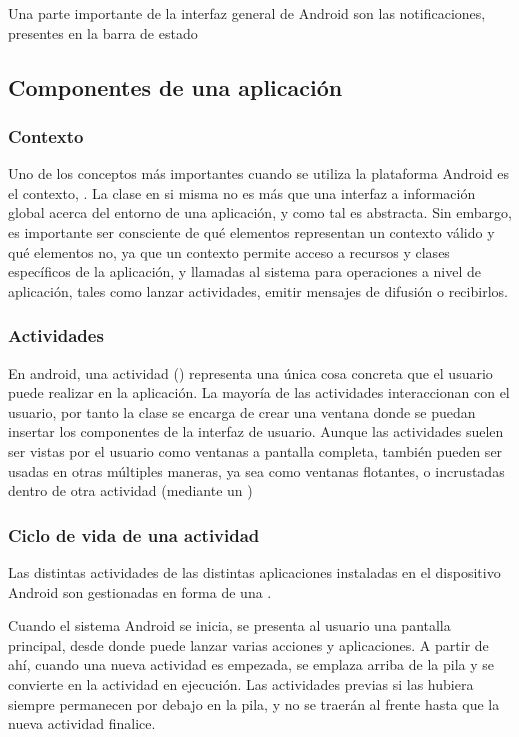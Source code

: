 Una parte importante de la interfaz general de Android son las notificaciones, presentes en la barra de estado

\subsection{Componentes de una aplicación}

\subsubsection{Contexto}

Uno de los conceptos más importantes cuando se utiliza la plataforma Android es el contexto, . La clase  en si misma no es más que una interfaz a información global acerca del entorno de una aplicación, y como tal es abstracta. Sin embargo, es importante ser consciente de qué elementos representan un contexto válido y qué elementos no, ya que un contexto permite acceso a recursos y clases específicos de la aplicación, y llamadas al sistema para operaciones a nivel de aplicación, tales como lanzar actividades, emitir mensajes de difusión o recibirlos.

\subsubsection{Actividades}

En android, una actividad () representa una única cosa concreta que el usuario puede realizar en la aplicación. La mayoría de las actividades interaccionan con el usuario, por tanto la clase  se encarga de crear una ventana donde se puedan insertar los componentes de la interfaz de usuario. Aunque las actividades suelen ser vistas por el usuario como ventanas a pantalla completa, también pueden ser usadas en otras múltiples maneras, ya sea como ventanas flotantes, o incrustadas dentro de otra actividad (mediante un )

\subsubsection{Ciclo de vida de una actividad}
Las distintas actividades de las distintas aplicaciones instaladas en el dispositivo Android son gestionadas en forma de una .
 
Cuando el sistema Android se inicia, se presenta al usuario una pantalla principal, desde donde puede lanzar varias acciones y aplicaciones. A partir de ahí, cuando una nueva actividad es empezada, se emplaza arriba de la pila y se convierte en la actividad en ejecución. Las actividades previas si las hubiera siempre permanecen por debajo en la pila, y no se traerán al frente hasta que la nueva actividad finalice.

